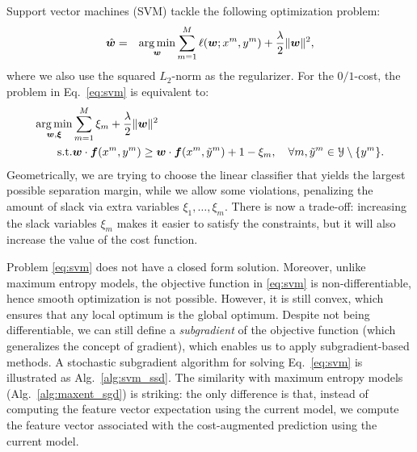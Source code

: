 Support vector machines (SVM) tackle the following optimization problem: 
\begin{eqnarray}\label{eq:svm} 
\hat{\boldsymbol{w}} &=& 
\operatorname*{arg\,min}_{\boldsymbol{w}} \sum_{m=1}^M \ell(\boldsymbol{w}; x^m, y^m)  + \frac{\lambda}{2} \|\boldsymbol{w}\|^2,
\end{eqnarray} 
where we also use the squared $L_2$-norm as the regularizer. 
For the $0/1$-cost, the problem in Eq.~\ref{eq:svm} is equivalent to: 
\begin{eqnarray}\label{eq:svm2} 
\operatorname*{arg\,min}_{\boldsymbol{w}, \boldsymbol{\xi}} & \sum_{m=1}^M \xi_m  + \frac{\lambda}{2} \|\boldsymbol{w}\|^2 \\
\text{s.t.} & \boldsymbol{w} \cdot \boldsymbol{f}(x^m,y^m) \ge \boldsymbol{w} \cdot \boldsymbol{f}(x^m,\tilde{y}^m) + 1 - \xi_m, \quad \forall m, \tilde{y}^m \in \mathcal{Y}\setminus \{y^m\}.
\end{eqnarray} 
Geometrically, we are trying to choose the linear classifier that yields the largest possible separation margin, 
while we allow some violations, penalizing the amount of slack via extra variables $\xi_1,\ldots,\xi_m$. There is now a trade-off: increasing the slack variables $\xi_m$ makes it easier to satisfy the constraints, but it will also increase the value of the cost function.

Problem \ref{eq:svm} does not have a closed form solution. Moreover, unlike maximum entropy models, the objective function in \ref{eq:svm} is non-differentiable, hence 
smooth optimization is not possible. However, it is still convex, which ensures that any local optimum is the global optimum. 
Despite not being differentiable, we can still define a \emph{subgradient} of the objective function (which generalizes the 
concept of gradient), which enables us to apply subgradient-based methods. 
A stochastic subgradient algorithm for solving Eq.~\ref{eq:svm} is illustrated as Alg.~\ref{alg:svm_ssd}. 
The similarity with maximum entropy models (Alg.~\ref{alg:maxent_sgd}) is striking: the only difference is that, instead of computing the feature vector expectation 
using the current model, we compute the feature vector associated with
the cost-augmented prediction using the current model. 

